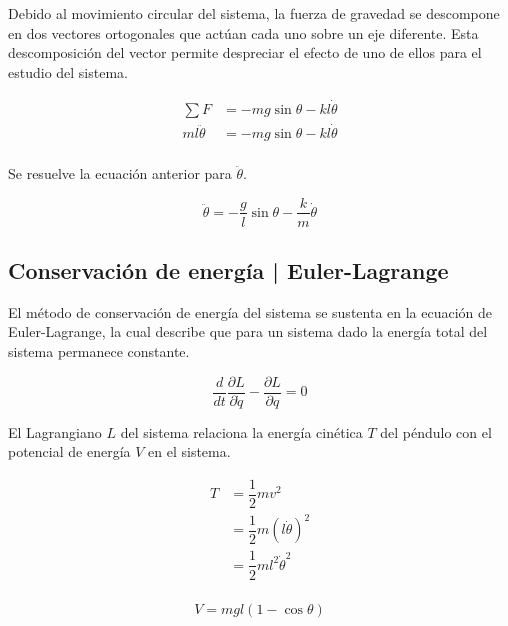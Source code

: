 Debido al movimiento circular del sistema, la fuerza de gravedad
se descompone en dos vectores ortogonales que actúan cada uno sobre un eje 
diferente. Esta descomposición del vector permite despreciar
el efecto de uno de ellos para el estudio del sistema.

\begin{equation*}
 \begin{split}
  \sum F &= -mg \sin{\theta} - k l \dot{\theta}\\
  m l \ddot{\theta} &= -mg \sin{\theta} - k l \dot{\theta}\\
 \end{split}
\end{equation*}

Se resuelve la ecuación anterior para $\ddot{\theta}$.

\begin{equation}
 \ddot{\theta} = - \dfrac{g}{l} \sin{\theta} - \dfrac{k}{m} \dot{\theta}
\end{equation}


\subsection{Conservación de energía | Euler-Lagrange}

El método de conservación de energía del sistema se sustenta
en la ecuación de Euler-Lagrange, la cual describe que para un
sistema dado la energía total del sistema permanece constante.

\begin{equation}
 \dfrac{d}{dt} \dfrac{\partial L}{\partial \dot{q}} - 
 \dfrac{\partial L}{\partial q} = 0
 \label{eq: euler lagrange equation}
\end{equation}

El Lagrangiano $L$ del sistema relaciona la energía cinética $T$ 
del péndulo con el potencial de energía $V$ en el sistema.

\begin{equation*}
\begin{split}
 T &= \dfrac{1}{2} m v^2\\
 &= \dfrac{1}{2} m (l\dot{\theta})^2\\
 &= \dfrac{1}{2} m l^2 \dot{\theta}^2\\
\end{split}
\label{eq: kinetic energy}
\end{equation*}

\begin{equation*}
 V = m g l \left( 1 - \cos{\theta} \right)
 \label{eq: potential energy}
\end{equation*}

